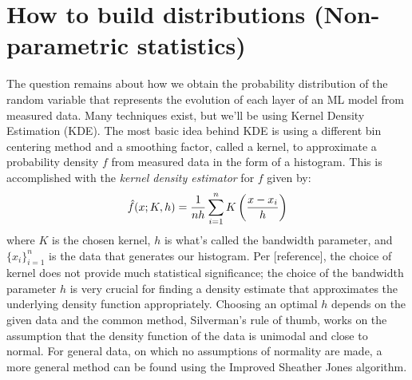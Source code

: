 \section{How to build distributions (Non-parametric statistics)}
The question remains about how we obtain the probability distribution of the random 
variable that represents the evolution of each layer of an ML model from measured data. 
Many techniques exist, but we'll be using Kernel Density Estimation (KDE). The most 
basic idea behind KDE is using a different bin centering method and a smoothing factor, 
called a kernel, to approximate a probability density $f$ from measured data in the form 
of a histogram. This is accomplished with the \emph{kernel density estimator} for $f$
given by:
$$\hat{f}(x; K, h) = \frac{1}{nh}\sum_{i = 1}^n K\left(\frac{x - x_i}{h}\right)$$
where $K$ is the chosen kernel, $h$ is what's called the bandwidth parameter, and 
$\{x_i\}_{i=1}^n$ is the data that generates our histogram. Per [reference], the choice 
of kernel does not provide much statistical significance; the choice of the bandwidth 
parameter $h$ is very crucial for finding a density estimate that approximates the 
underlying density function appropriately. Choosing an optimal $h$ depends on 
the given data and the common method, Silverman's rule of thumb, works on the 
assumption that the density function of the data is unimodal and close to 
normal. For general data, on which no assumptions of normality are made, a more 
general method can be found using the Improved Sheather Jones algorithm.



